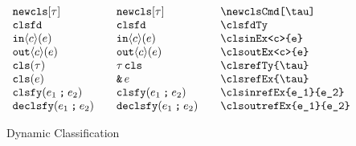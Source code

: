 \documentclass[11pt]{article}
\begin{document}
\begin{figure}

  \begin{small}
    \begin{displaymath}
      \begin{array}{l@{\qquad}l@{\qquad}l@{\qquad}l}
        \newclsCmd[\tau]              & \newclsCmd*[\tau]     & \verb|\newclsCmd[\tau]| \\
        \clsfdTy                      & \clsfdTy*             & \verb|\clsfdTy| \\
        \clsinEx<c>{e}                & \clsinEx*<c>{e}       & \verb|\clsinEx<c>{e}| \\
        \clsoutEx<c>{e}               & \clsoutEx*<c>{e}      & \verb|\clsoutEx<c>{e}| \\
        \clsrefTy{\tau}               & \clsrefTy*{\tau}      & \verb|\clsrefTy{\tau}| \\
        \clsrefEx{e}                  & \clsrefEx*{e}         & \verb|\clsrefEx{\tau}| \\
        \clsinrefEx{e_1}{e_2}         & \clsinrefEx*{e_1}{e_2} & \verb|\clsinrefEx{e_1}{e_2}| \\
        \clsoutrefEx{e_1}{e_2}        & \clsoutrefEx*{e_1}{e_2} & \verb|\clsoutrefEx{e_1}{e_2}|
      \end{array}
    \end{displaymath}
  \end{small}

  \caption{Dynamic Classification}
  \label{fig:clsfd}
\end{figure}
\end{document}
